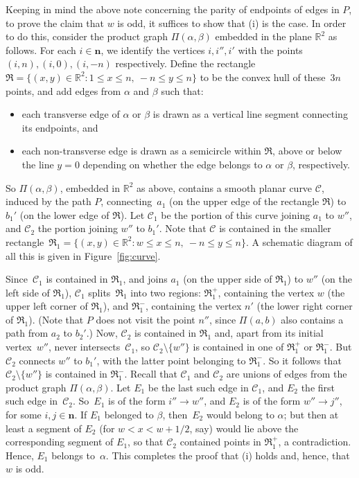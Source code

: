 \documentclass[11pt,a4paper]{article}
\newcommand{\C}{\mathscr C}
\newcommand{\bn}{\mathbf{n}}
\newcommand{\al}{\alpha}
\newcommand{\be}{\beta}
\newcommand{\bigset}[2]{\big\{ {#1}: {#2} \big\}}
\newcommand{\Rect}{\mathfrak{R}}
\newcommand{\Rtwo}{\mathbb R^2}
\newcommand{\1}{\id_n}
\newcommand{\sm}{\setminus}
\newcommand{\bit}{\begin{itemize}}
\newcommand{\eit}{\end{itemize}}
\numberwithin{equation}{section}
\theoremstyle{definition}
\begin{document}
\begin{itemize}
\begin{itemize}
\begin{itemize}
\begin{itemize}
\begin{itemize}
\begin{itemize}
\begin{itemize}
\begin{itemize}
\begin{itemize}
\begin{itemize}
\begin{itemize}
\begin{itemize}
\begin{itemize}
Keeping in mind the above note concerning the parity of endpoints of edges in $P$, to prove the claim that $w$ is odd, it suffices to show that (i) is the case.  
%
In order to do this, consider the product graph $\Pi(\al,\be)$ embedded in the plane $\Rtwo$ as follows.  For each $i\in\bn$, we identify the vertices $i,i'',i'$ with the points $(i,n),(i,0),(i,-n)$ respectively.  Define the rectangle $\Rect=\bigset{(x,y)\in\Rtwo}{1\leq x\leq n,\ -n\leq y\leq n}$ to be the convex hull of these~$3n$ points, and add edges from $\al$ and $\be$ such that:
\bit
\item each transverse edge of $\al$ or $\be$ is drawn as a vertical line segment connecting its endpoints, and 
\item each non-transverse edge is drawn as a semicircle within $\Rect$, above or below the line $y=0$ depending on whether the edge belongs to $\al$ or $\be$, respectively.
\eit
So $\Pi(\al,\be)$, embedded in $\Rtwo$ as above, contains a smooth planar curve $\C$, induced by the path $P$, connecting~$a_1$ (on the upper edge of the rectangle $\Rect$) to $b_1'$ (on the lower edge of $\Rect$).  Let $\C_1$ be the portion of this curve joining $a_1$ to $w''$, and $\C_2$ the portion joining $w''$ to $b_1'$.  Note that $\C$ is contained in the smaller rectangle~${\Rect_1=\bigset{(x,y)\in\Rtwo}{w\leq x\leq n,\ -n\leq y\leq n}}$.  A schematic diagram of all this is given in Figure~\ref{fig:curve}.  

Since~$\C_1$ is contained in $\Rect_1$, and joins $a_1$ (on the upper side of $\Rect_1$) to $w''$ (on the left side of $\Rect_1$), $\C_1$ splits~$\Rect_1$ into two regions: $\Rect_1^+$, containing the vertex $w$ (the upper left corner of $\Rect_1$), and $\Rect_1^-$, containing the vertex $n'$ (the lower right corner of $\Rect_1$).  (Note that $P$ does not visit the point $n''$, since $\Pi(a,b)$ also contains a path from $a_2$ to $b_2'$.)  Now, $\C_2$ is contained in $\Rect_1$ and, apart from its initial vertex~$w''$, never intersects~$\C_1$, so $\C_2\sm\{w''\}$ is contained in one of $\Rect_1^+$ or $\Rect_1^-$.  But $\C_2$ connects $w''$ to $b_1'$, with the latter point belonging to $\Rect_1^-$.  So it follows that $\C_2\sm\{w''\}$ is contained in $\Rect_1^-$.  
%
Recall that $\C_1$ and $\C_2$ are unions of edges from the product graph $\Pi(\al,\be)$.  Let $E_1$ be the last such edge in $\C_1$, and $E_2$ the first such edge in~$\C_2$.  So~$E_1$ is of the form $i''\to w''$, and $E_2$ is of the form $w''\to j''$, for some $i,j\in\bn$.  If $E_1$ belonged to $\be$, then~$E_2$ would belong to $\al$; but then at least a segment of $E_2$ (for $w<x<w+1/2$, say) would lie above the corresponding segment of $E_1$, so that $\C_2$ contained points in $\Rect_1^+$, a contradiction.  Hence, $E_1$ belongs to~$\al$.  This completes the proof that (i) holds and, hence, that $w$ is odd.


\end{itemize}
\end{itemize}
\end{itemize}
\end{itemize}
\end{itemize}
\end{itemize}
\end{itemize}
\end{itemize}
\end{itemize}
\end{itemize}
\end{itemize}
\end{itemize}
\end{itemize}
\end{document}
